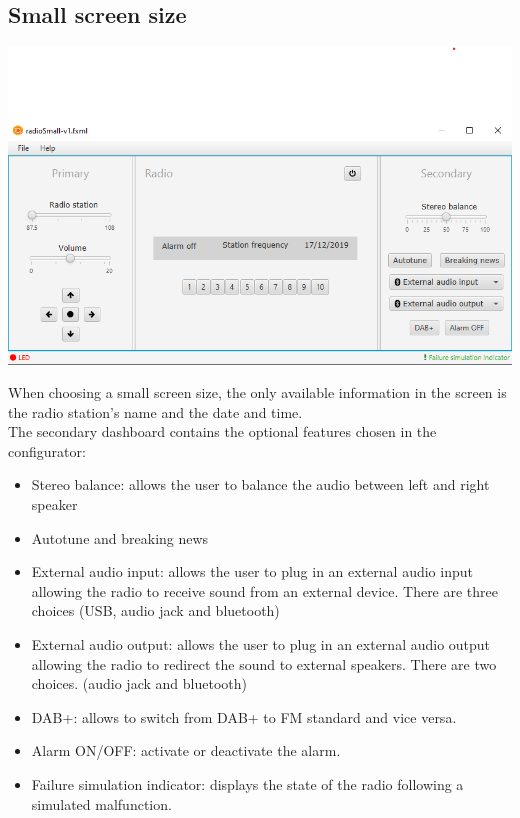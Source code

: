 \documentclass[11pt]{article}
\begin{document}
\subsection{Small screen size}
\vspace{10px}
\begin{center}
\includegraphics[width=15cm]{../Screenshots/radioSmall-v2.png}\\
\end{center}
When choosing a small screen size, the only available information in the screen is the radio station's name and the date and time.\\ The secondary dashboard contains the optional features chosen in the configurator:
\begin{itemize}
\item Stereo balance: allows the user to balance the audio between left and right speaker
\item Autotune and breaking news
\item External audio input: allows the user to plug in an external audio input allowing the radio to receive sound from an external device. There are three choices (USB, audio jack and bluetooth)
\item External audio output: allows the user to plug in an external audio output allowing the radio to redirect the sound to external speakers. There are two choices. (audio jack and bluetooth)
\item DAB+: allows to switch from DAB+ to FM standard and vice versa.
\item Alarm ON/OFF: activate or deactivate the alarm.
\item Failure simulation indicator: displays the state of the radio following a simulated malfunction.
\end{itemize}
\end{document}
